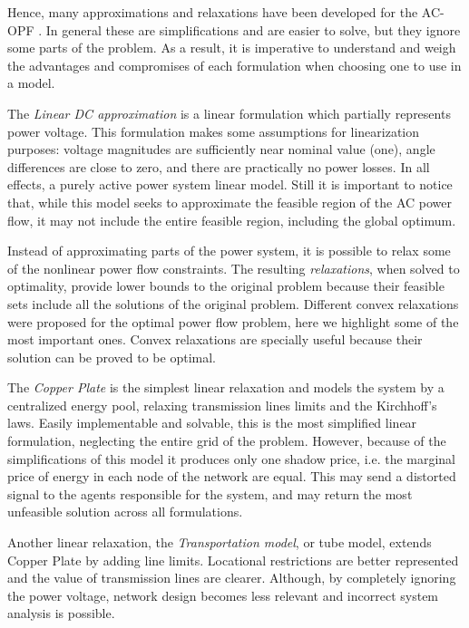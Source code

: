 \documentclass{juliacon}
\begin{document}
Hence, many approximations and relaxations have been developed for the AC-OPF \cite{molzahn2019survey}. In general these are simplifications and are easier to solve, but they ignore some parts of the problem. As a result, it is imperative to understand and weigh the advantages and compromises of each formulation when choosing one to use in a model.

The \textit{Linear DC approximation} is a linear formulation which partially represents power voltage. This formulation makes some assumptions for linearization purposes: voltage magnitudes are sufficiently near nominal value (one), angle differences are close to zero, and there are practically no power losses. In all effects, a purely active power system linear model. Still it is important to notice that, while this model seeks to approximate the feasible region of the AC power flow, it may not include the entire feasible region, including the global optimum. 

Instead of approximating parts of the power system, it is possible to relax some of the nonlinear power flow constraints. The resulting \textit{relaxations}, when solved to optimality, provide lower bounds to the original problem because their feasible sets include all the solutions of the original problem. Different convex relaxations were proposed for the optimal power flow problem, here we highlight some of the most important ones. Convex relaxations are specially useful because their solution can be proved to be optimal.

The \textit{Copper Plate} is the simplest linear relaxation and models the system by a centralized energy pool, relaxing transmission lines limits and the Kirchhoff’s laws. Easily implementable and solvable, this is the most simplified linear formulation, neglecting the entire grid of the problem. However, because of the simplifications of this model it produces only one shadow price, i.e. the marginal price of energy in each node of the network are equal. This may send a distorted signal to the agents responsible for the system, and may return the most unfeasible solution across all formulations.

Another linear relaxation, the \textit{Transportation model}, or tube model, extends Copper Plate by adding line limits. Locational restrictions are better represented and the value of transmission lines are clearer. Although, by completely ignoring the power voltage, network design becomes less relevant and incorrect system analysis is possible.
\end{document}
